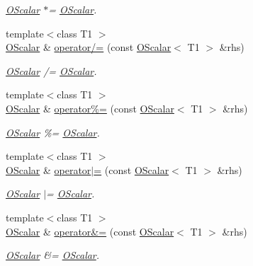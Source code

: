 \begin{DoxyCompactItemize}
\begin{DoxyCompactList}\small\item\em \mbox{\hyperlink{classENSEM_1_1OScalar}{O\+Scalar}} $\ast$= \mbox{\hyperlink{classENSEM_1_1OScalar}{O\+Scalar}}. \end{DoxyCompactList}\item 
{\footnotesize template$<$class T1 $>$ }\\\mbox{\hyperlink{classENSEM_1_1OScalar}{O\+Scalar}} \& \mbox{\hyperlink{classENSEM_1_1OScalar_a1e0517e29754a8acb284c3ac266c2b2c}{operator/=}} (const \mbox{\hyperlink{classENSEM_1_1OScalar}{O\+Scalar}}$<$ T1 $>$ \&rhs)
\begin{DoxyCompactList}\small\item\em \mbox{\hyperlink{classENSEM_1_1OScalar}{O\+Scalar}} /= \mbox{\hyperlink{classENSEM_1_1OScalar}{O\+Scalar}}. \end{DoxyCompactList}\item 
{\footnotesize template$<$class T1 $>$ }\\\mbox{\hyperlink{classENSEM_1_1OScalar}{O\+Scalar}} \& \mbox{\hyperlink{classENSEM_1_1OScalar_a89a76b1229e185250c0b9c48ae13d98b}{operator\%=}} (const \mbox{\hyperlink{classENSEM_1_1OScalar}{O\+Scalar}}$<$ T1 $>$ \&rhs)
\begin{DoxyCompactList}\small\item\em \mbox{\hyperlink{classENSEM_1_1OScalar}{O\+Scalar}} \%= \mbox{\hyperlink{classENSEM_1_1OScalar}{O\+Scalar}}. \end{DoxyCompactList}\item 
{\footnotesize template$<$class T1 $>$ }\\\mbox{\hyperlink{classENSEM_1_1OScalar}{O\+Scalar}} \& \mbox{\hyperlink{classENSEM_1_1OScalar_aeffba612ea04593253d41332d6d2aa82}{operator$\vert$=}} (const \mbox{\hyperlink{classENSEM_1_1OScalar}{O\+Scalar}}$<$ T1 $>$ \&rhs)
\begin{DoxyCompactList}\small\item\em \mbox{\hyperlink{classENSEM_1_1OScalar}{O\+Scalar}} $\vert$= \mbox{\hyperlink{classENSEM_1_1OScalar}{O\+Scalar}}. \end{DoxyCompactList}\item 
{\footnotesize template$<$class T1 $>$ }\\\mbox{\hyperlink{classENSEM_1_1OScalar}{O\+Scalar}} \& \mbox{\hyperlink{classENSEM_1_1OScalar_a9a192875355f059d207c579e2514b2a3}{operator\&=}} (const \mbox{\hyperlink{classENSEM_1_1OScalar}{O\+Scalar}}$<$ T1 $>$ \&rhs)
\begin{DoxyCompactList}\small\item\em \mbox{\hyperlink{classENSEM_1_1OScalar}{O\+Scalar}} \&= \mbox{\hyperlink{classENSEM_1_1OScalar}{O\+Scalar}}. \end{DoxyCompactList}\item 

\end{DoxyCompactItemize}
